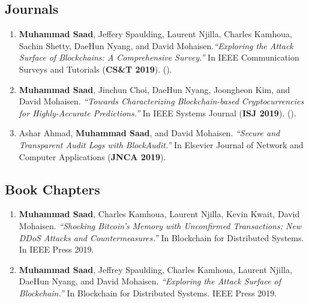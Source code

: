 \documentclass[10pt]{article}
\begin{document}
\subsection*{\sc \textcolor{red!70!black}{ Journals}}\label{publications}
\begin{enumerate}\itemsep=1.5mm
\item {\bf Muhammad Saad}, Jeffery Spaulding,  Laurent Njilla,  Charles Kamhoua, Sachin Shetty, DaeHun Nyang, and David Mohaisen.{\em ``Exploring the Attack Surface of Blockchains: A Comprehensive Survey.''} In IEEE Communication Surveys and Tutorials (\textbf{CS\&T 2019}). ({\color{red!70!black}{Impact Factor 29}}).

\item {\bf Muhammad Saad}, Jinchun Choi,  DaeHun Nyang,  Joongheon Kim, and David Mohaisen. {\em ``Towards Characterizing Blockchain-based
Cryptocurrencies for Highly-Accurate Predictions.''} In IEEE Systems Journal (\textbf{ISJ 2019}). ({\color{red!70!black}{ Best Paper Award}}).

\item Ashar Ahmad, {\bf Muhammad Saad}, and David Mohaisen. {\em``Secure and Transparent Audit Logs with BlockAudit.''} In Elsevier Journal of Network and Computer Applications (\textbf{JNCA 2019}).

\end{enumerate}

\subsection*{\sc \textcolor{red!70!black}{ Book Chapters}}\label{publications}
\begin{enumerate}\itemsep=1.5mm

\item {\bf Muhammad Saad}, Charles Kamhoua, Laurent Njilla, Kevin Kwait, David Mohaisen. 
{\em ``Shocking Bitcoin’s Memory with Unconfirmed Transactions: New DDoS Attacks and Countermeasures.''} In Blockchain for Distributed Systems. In IEEE Press 2019.

\item {\bf Muhammad Saad}, Jeffrey Spaulding, Charles Kamhoua, Laurent Njilla, DaeHun Nyang, and David Mohaisen. {\em ``Exploring the Attack Surface of Blockchain.''} In Blockchain for Distributed Systems. IEEE Press 2019.
\end{enumerate}
\end{document}
